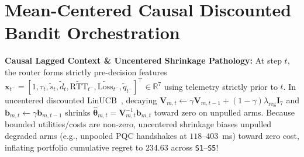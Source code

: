 \documentclass[10pt,journal,compsoc]{IEEEtran}
\begin{document}
\section{Mean-Centered Causal Discounted Bandit Orchestration}\label{sec:bandit}
\textbf{Causal Lagged Context \& Uncentered Shrinkage Pathology:} At step $t$, the router forms strictly pre-decision features $\mathbf{x}_{t^-} = [1, \tau_t, \tilde{s}_t, \tilde{d}_t, \widetilde{\mathrm{RTT}}_{t^-}, \widetilde{\mathrm{Loss}}_{t^-}, \tilde{q}_{t^-}]^\top \in \mathbb{R}^7$ using telemetry strictly prior to $t$. In uncentered discounted LinUCB~\cite{russac2019dlinucb}, decaying $\mathbf{V}_{m,t} \leftarrow \gamma \mathbf{V}_{m,t-1} + (1-\gamma)\lambda_{\mathrm{reg}}\mathbf{I}_7$ and $\mathbf{b}_{m,t} \leftarrow \gamma \mathbf{b}_{m,t-1}$ shrinks $\hat{\boldsymbol{\theta}}_{m,t} = \mathbf{V}_{m,t}^{-1}\mathbf{b}_{m,t}$ toward zero on unpulled arms. Because bounded utilities/costs are non-zero, uncentered shrinkage biases unpulled degraded arms (e.g., unpooled PQC handshakes at $118$--$403$~ms) toward zero cost, inflating portfolio cumulative regret to $234.63$ across \texttt{S1}--\texttt{S5}!
\end{document}
